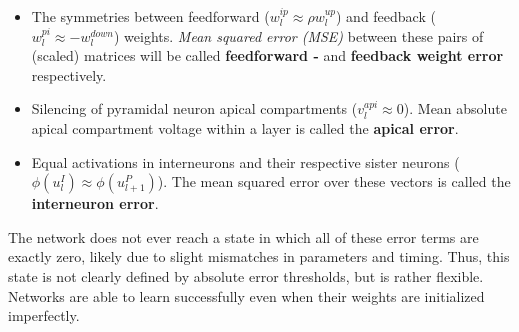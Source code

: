\begin{itemize}
  \item The symmetries between feedforward ($w_l^{ip} \approx \rho w_l^{up}$) and feedback ($w_l^{pi} \approx
          -w_l^{down}$) weights. \textit{Mean squared error (MSE)} between these pairs of (scaled) matrices will be
          called \textbf{feedforward - } and \textbf{feedback weight error} respectively.
  \item Silencing of pyramidal neuron apical compartments ($v_l^{api} \approx 0$). Mean absolute apical compartment
        voltage within a layer is called the \textbf{apical error}.
  \item Equal activations in interneurons and their respective sister neurons ($\phi (u_l^I) \approx \phi (u_{l+1}^P)$).
        The mean squared error over these vectors is called the \textbf{interneuron error}.
\end{itemize}

The network does not ever reach a state in which all of these error terms are exactly zero, likely due to slight
mismatches in parameters and timing. Thus, this state is not clearly defined by absolute error thresholds, but is rather
flexible. Networks are able to learn successfully even when their weights are initialized imperfectly.


